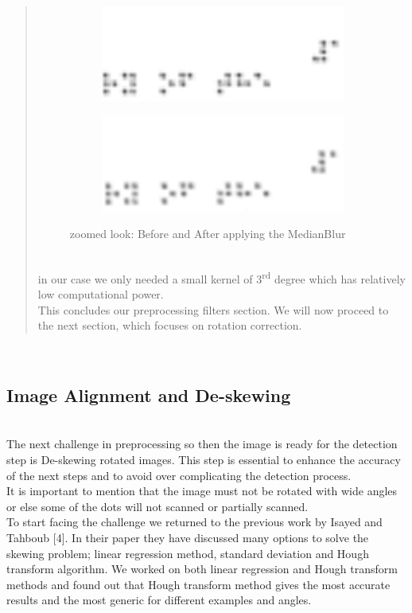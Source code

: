 \begin{quote}
\newpage
\begin{figure}[h!]
     \centering
     \begin{subfigure}
         \centering
         \includegraphics[width=.8\textwidth]{Before medianBlur.png}
     \end{subfigure}
     \hfill
     \begin{subfigure}
         \centering
         \includegraphics[width=.8\textwidth]{After medianBlur.png}
     \end{subfigure}
        \caption{zoomed look: Before and After applying the MedianBlur}
        \label{fig:Clear real braille samples}
\end{figure}\\
\quad in our case we only needed a small kernel of 3\textsuperscript{rd} degree
which has relatively low computational power.\\

\quad This concludes our preprocessing filters
section. We will now proceed to the next section, which focuses on
rotation correction.
\end{quote}\\

\newpage
\subsection{\textbf{Image Alignment and De-skewing } }\\
 The next challenge in preprocessing so then the image is ready for the detection step is De-skewing rotated images. This step is essential to enhance the accuracy of the next steps and to avoid over complicating the detection process.\\
\quad It is important to mention that the image must not be rotated with wide angles or else some of the dots will not scanned or partially scanned.\\
\quad To start facing the challenge we returned to the previous work by Isayed and Tahboub [4]. In their paper they have discussed many options to solve the skewing problem; linear regression method, standard deviation and Hough transform algorithm. We worked on both linear regression and Hough transform methods and found out that Hough transform method gives the most accurate results and the most generic for different examples and angles.\\
